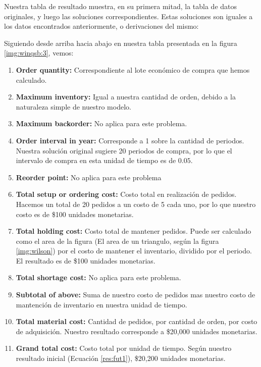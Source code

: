 Nuestra tabla de resultado muestra, en su primera mitad, la tabla de datos originales, y luego las soluciones correspondientes. Estas soluciones son iguales a los datos encontrados anteriormente, o derivaciones del mismo:

Siguiendo desde arriba hacia abajo en nuestra tabla presentada en la figura \ref{img:winqsb:3}, vemos:

\begin{enumerate}
    \item \textbf{Order quantity:} Correspondiente al lote económico de compra que hemos calculado.
    \item \textbf{Maximum inventory:} Igual a nuestra cantidad de orden, debido a la naturaleza simple de nuestro modelo.
    \item \textbf{Maximum backorder:} No aplica para este problema.
    \item \textbf{Order interval in year:} Corresponde a 1 sobre la cantidad de periodos. Nuestra solución original sugiere 20 periodos de compra, por lo que el intervalo de compra en esta unidad de tiempo es de $0.05$.
    \item \textbf{Reorder point:} No aplica para este problema
    \item \textbf{Total setup or ordering cost:} Costo total en realización de pedidos. Hacemos un total de 20 pedidos a un costo de 5 cada uno, por lo que nuestro costo es de \$100 unidades monetarias.
    \item \textbf{Total holding cost:} Costo total de mantener pedidos. Puede ser calculado como el area de la figura (El area de un triangulo, según la figura \ref{img:wilson}) por el costo de mantener el inventario, dividido por el periodo. El resultado es de \$100 unidades monetarias.
    \item \textbf{Total shortage cost:} No aplica para este problema.
    \item \textbf{Subtotal of above:} Suma de nuestro costo de pedidos mas nuestro costo de mantención de inventario en nuestra unidad de tiempo.
    \item \textbf{Total material cost:} Cantidad de pedidos, por cantidad de orden, por costo de adquisición. Nuestro resultado corresponde a \$20,000 unidades monetarias.
    \item \textbf{Grand total cost:} Costo total por unidad de tiempo. Según nuestro resultado inicial (Ecuación \ref{res:fut1}), \$20,200 unidades monetarias.
\end{enumerate}


